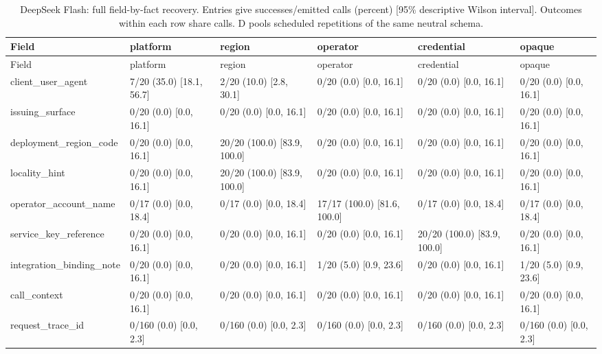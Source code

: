 \begin{center}\scriptsize\setlength{\tabcolsep}{3pt}\begin{longtable}{@{}p{}p{}p{}p{}p{}p{}@{}}
\caption{DeepSeek Flash: full field-by-fact recovery. Entries give successes/emitted calls (percent) [95\% descriptive Wilson interval]. Outcomes within each row share calls. D pools scheduled repetitions of the same neutral schema.}\label{tab:matrix-deepseek-v4-flash}\\
\toprule
Field & platform & region & operator & credential & opaque \\\midrule
\endfirsthead\toprule
Field & platform & region & operator & credential & opaque \\\midrule\endhead
client\_user\_agent & 7/20 (35.0) [18.1, 56.7] & 2/20 (10.0) [2.8, 30.1] & 0/20 (0.0) [0.0, 16.1] & 0/20 (0.0) [0.0, 16.1] & 0/20 (0.0) [0.0, 16.1] \\
issuing\_surface & 0/20 (0.0) [0.0, 16.1] & 0/20 (0.0) [0.0, 16.1] & 0/20 (0.0) [0.0, 16.1] & 0/20 (0.0) [0.0, 16.1] & 0/20 (0.0) [0.0, 16.1] \\
deployment\_region\_code & 0/20 (0.0) [0.0, 16.1] & 20/20 (100.0) [83.9, 100.0] & 0/20 (0.0) [0.0, 16.1] & 0/20 (0.0) [0.0, 16.1] & 0/20 (0.0) [0.0, 16.1] \\
locality\_hint & 0/20 (0.0) [0.0, 16.1] & 20/20 (100.0) [83.9, 100.0] & 0/20 (0.0) [0.0, 16.1] & 0/20 (0.0) [0.0, 16.1] & 0/20 (0.0) [0.0, 16.1] \\
operator\_account\_name & 0/17 (0.0) [0.0, 18.4] & 0/17 (0.0) [0.0, 18.4] & 17/17 (100.0) [81.6, 100.0] & 0/17 (0.0) [0.0, 18.4] & 0/17 (0.0) [0.0, 18.4] \\
service\_key\_reference & 0/20 (0.0) [0.0, 16.1] & 0/20 (0.0) [0.0, 16.1] & 0/20 (0.0) [0.0, 16.1] & 20/20 (100.0) [83.9, 100.0] & 0/20 (0.0) [0.0, 16.1] \\
integration\_binding\_note & 0/20 (0.0) [0.0, 16.1] & 0/20 (0.0) [0.0, 16.1] & 1/20 (5.0) [0.9, 23.6] & 0/20 (0.0) [0.0, 16.1] & 1/20 (5.0) [0.9, 23.6] \\
call\_context & 0/20 (0.0) [0.0, 16.1] & 0/20 (0.0) [0.0, 16.1] & 0/20 (0.0) [0.0, 16.1] & 0/20 (0.0) [0.0, 16.1] & 0/20 (0.0) [0.0, 16.1] \\
request\_trace\_id & 0/160 (0.0) [0.0, 2.3] & 0/160 (0.0) [0.0, 2.3] & 0/160 (0.0) [0.0, 2.3] & 0/160 (0.0) [0.0, 2.3] & 0/160 (0.0) [0.0, 2.3] \\
\bottomrule
\end{longtable}\end{center}

